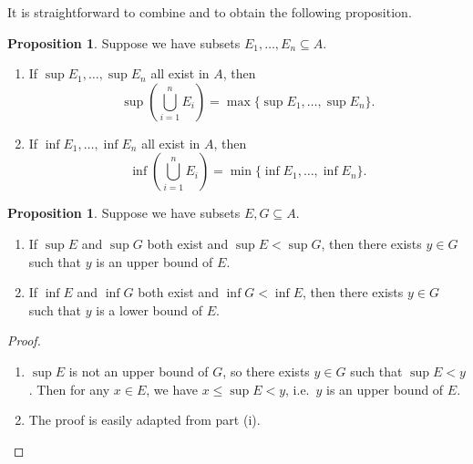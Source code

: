 \documentclass[12pt]{article}
\theoremstyle{definition}
\newtheorem{proposition}[definition]{Proposition}
\begin{document}
It is straightforward to combine  and  to obtain the following proposition.

\begin{proposition}
\label{prop:sup_inf_unions_total_order}
    Suppose we have subsets \( E_1, \ldots, E_n \subseteq A \).
    \begin{enumerate}[label = (\roman*)]
        \item If \( \sup E_1, \ldots, \sup E_n \) all exist in \( A \), then
        \[
            \textstyle{\sup \left( \bigcup_{i=1}^{n} E_i \right) = \max \{ \sup E_1, \ldots, \sup E_n \}}.
        \]

        \item If \( \inf E_1, \ldots, \inf E_n \) all exist in \( A \), then
        \[
            \textstyle{\inf \left( \bigcup_{i=1}^{n} E_i \right) = \min \{ \inf E_1, \ldots, \inf E_n \}}.
        \]
    \end{enumerate}
\end{proposition}

\begin{proposition}
\label{prop:sup/inf_strictly_comparable_implies_bounds}
    Suppose we have subsets \( E, G \subseteq A \).
    \begin{enumerate}[label = (\roman*)]
        \item If \( \sup E \) and \( \sup G \) both exist and \( \sup E < \sup G \), then there exists \( y \in G \) such that \( y \) is an upper bound of \( E \).

        \item If \( \inf E \) and \( \inf G \) both exist and \( \inf G < \inf E \), then there exists \( y \in G \) such that \( y \) is a lower bound of \( E \).
    \end{enumerate}
\end{proposition}

\begin{proof}
    \begin{enumerate}[label = (\roman*)]
        \item \( \sup E \) is not an upper bound of \( G \), so there exists \( y \in G \) such that \( \sup E < y \). Then for any \( x \in E \), we have \( x \leq \sup E < y \), i.e.\ \( y \) is an upper bound of \( E \).

        \item The proof is easily adapted from part (i). \qedhere
    \end{enumerate}
\end{proof}
\end{document}
